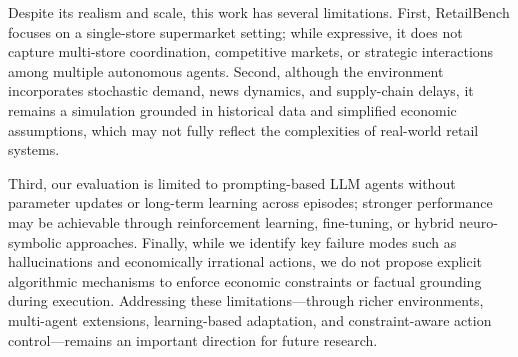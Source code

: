 Despite its realism and scale, this work has several limitations. First, RetailBench focuses on a single-store supermarket setting; while expressive, it does not capture multi-store coordination, competitive markets, or strategic interactions among multiple autonomous agents. Second, although the environment incorporates stochastic demand, news dynamics, and supply-chain delays, it remains a simulation grounded in historical data and simplified economic assumptions, which may not fully reflect the complexities of real-world retail systems.

Third, our evaluation is limited to prompting-based LLM agents without parameter updates or long-term learning across episodes; stronger performance may be achievable through reinforcement learning, fine-tuning, or hybrid neuro-symbolic approaches. Finally, while we identify key failure modes such as hallucinations and economically irrational actions, we do not propose explicit algorithmic mechanisms to enforce economic constraints or factual grounding during execution. Addressing these limitations—through richer environments, multi-agent extensions, learning-based adaptation, and constraint-aware action control—remains an important direction for future research.